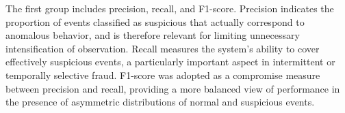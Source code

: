 \documentclass[journal]{IEEEtran}
\begin{document}

The first group includes precision, recall, and F1-score. Precision indicates the proportion of events classified as suspicious that actually correspond to anomalous behavior, and is therefore relevant for limiting unnecessary intensification of observation. Recall measures the system's ability to cover effectively suspicious events, a particularly important aspect in intermittent or temporally selective fraud. F1-score was adopted as a compromise measure between precision and recall, providing a more balanced view of performance in the presence of asymmetric distributions of normal and suspicious events.
\end{document}
